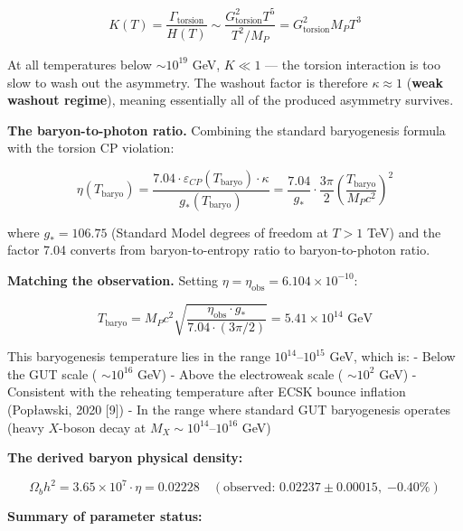 \documentclass[11pt,a4paper]{article}
\theoremstyle{definition}\newtheorem{definition}{Definition}
\theoremstyle{remark}\newtheorem{remark}{Remark}
\begin{document}
\begin{equation}
K(T) = \frac{\Gamma_{\text{torsion}}}{H(T)} \sim \frac{G_{\text{torsion}}^2 T^5}{T^2 / M_P} = G_{\text{torsion}}^2 M_P T^3
\end{equation}


At all temperatures below $\sim 10^{19}$ GeV, $K \ll 1$ — the torsion interaction is too slow to wash out the asymmetry. The washout factor is therefore $\kappa \approx 1$ (\textbf{weak washout regime}), meaning essentially all of the produced asymmetry survives.

\textbf{The baryon-to-photon ratio.} Combining the standard baryogenesis formula with the torsion CP violation:


\begin{equation}
\boxed{\eta(T_{\text{baryo}}) = \frac{7.04 \cdot \varepsilon_{CP}(T_{\text{baryo}}) \cdot \kappa}{g_*(T_{\text{baryo}})} = \frac{7.04}{g_*} \cdot \frac{3\pi}{2} \left(\frac{T_{\text{baryo}}}{M_P c^2}\right)^2}
\end{equation}


where $g_* = 106.75$ (Standard Model degrees of freedom at $T > 1$ TeV) and the factor 7.04 converts from baryon-to-entropy ratio to baryon-to-photon ratio.

\textbf{Matching the observation.} Setting $\eta = \eta_{\text{obs}} = 6.104 \times 10^{-10}$:


\begin{equation}
T_{\text{baryo}} = M_P c^2 \sqrt{\frac{\eta_{\text{obs}} \cdot g_*}{7.04 \cdot (3\pi/2)}} = 5.41 \times 10^{14} \text{ GeV}
\end{equation}


This baryogenesis temperature lies in the range $10^{14}$–$10^{15}$ GeV, which is:
- Below the GUT scale ( $\sim 10^{16}$ GeV)
- Above the electroweak scale ( $\sim 10^{2}$ GeV)
- Consistent with the reheating temperature after ECSK bounce inflation (Popławski, 2020 [9])
- In the range where standard GUT baryogenesis operates (heavy $X$-boson decay at $M_X \sim 10^{14}$–$10^{16}$ GeV)

\textbf{The derived baryon physical density:}


\begin{equation}
\boxed{\Omega_b h^2 = 3.65 \times 10^7 \cdot \eta = 0.02228 \quad (\text{observed: } 0.02237 \pm 0.00015, \; \mathbf{-0.40\%})}
\end{equation}


\textbf{Summary of parameter status:}
\end{document}

